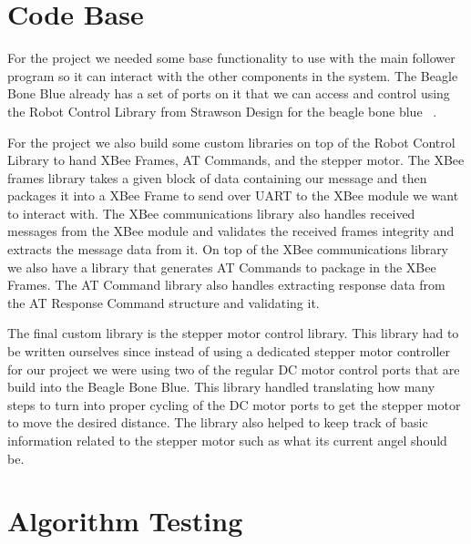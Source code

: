 \section{Code Base}

For the project we needed some base functionality to use with the main follower program so it can interact with the other components in the system.  The Beagle Bone Blue already has a set of ports on it that we can access and control using the Robot Control Library from Strawson Design for the beagle bone blue ~\cite{Robot_Control_Library}. \par
For the project we also build some custom libraries on top of the Robot Control Library to hand XBee Frames, AT Commands, and the stepper motor.  The XBee frames library takes a given block of data containing our message and then packages it into a XBee Frame to send over UART to the XBee module we want to interact with.  The XBee communications library also handles received messages from the XBee module and validates the received frames integrity and extracts the message data from it.  On top of the XBee communications library we also have a library that generates AT Commands to package in the XBee Frames.  The AT Command library also handles extracting response data from the AT Response Command structure and validating it.\par
The final custom library is the stepper motor control library.  This library had to be written ourselves since instead of using a dedicated stepper motor controller for our project we were using two of the regular DC motor control ports that are build into the Beagle Bone Blue.  This library handled translating how many steps to turn into proper cycling of the DC motor ports to get the stepper motor to move the desired distance.  The library also helped to keep track of basic information related to the stepper motor such as what its current angel should be.


\section{Algorithm Testing}




